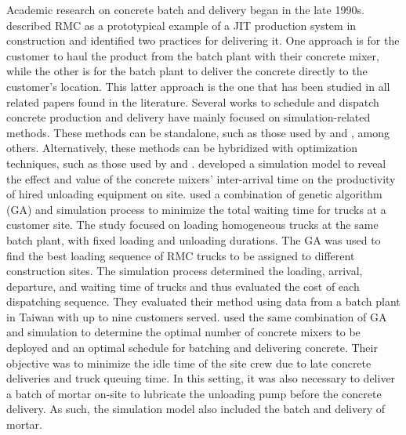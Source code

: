 \documentclass[]{article}
\begin{document}
Academic research on concrete batch and delivery began in the late 1990s. \cite{tommelein1999just} described RMC as a prototypical example of a JIT production system in construction and identified two practices for delivering it. One approach is for the customer to haul the product from the batch plant with their concrete mixer, while the other is for the batch plant to deliver the concrete directly to the customer's location. This latter approach is the one that has been studied in all related papers found in the literature. Several works to schedule and dispatch concrete production and delivery have mainly focused on simulation-related methods. These methods can be standalone, such as those used by \cite{zayed2001simulation} and \cite{wang2001scheduling}, among others. Alternatively, these methods can be hybridized with optimization techniques, such as those used by \cite{feng2004optimizing} and \cite{lu2005optimized}. \cite{wang2001scheduling} developed a simulation model to reveal the effect and value of the concrete mixers' inter-arrival time on the productivity of hired unloading equipment on site. \cite{feng2004optimizing} used a combination of genetic algorithm (GA) and simulation process to minimize the total waiting time for trucks at a customer site. The study focused on loading homogeneous trucks at the same batch plant, with fixed loading and unloading durations. The GA was used to find the best loading sequence of RMC trucks to be assigned to different construction sites. The simulation process determined the loading, arrival, departure, and waiting time of trucks and thus evaluated the cost of each dispatching sequence. They evaluated their method using data from a batch plant in Taiwan with up to nine customers served. \cite{lu2005optimized} used the same combination of GA and simulation to determine the optimal number of concrete mixers to be deployed and an optimal schedule for batching and delivering concrete. Their objective was to minimize the idle time of the site crew due to late concrete deliveries and truck queuing time. In this setting, it was also necessary to deliver a batch of mortar on-site to lubricate the unloading pump before the concrete delivery. As such, the simulation model also included the batch and delivery of mortar.
\end{document}

